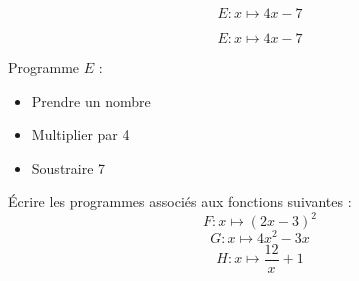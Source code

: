 \begin{frame}
    \begin{minipage}[t]{0.45\textwidth}
        $$E:x\mapsto 4x-7$$
    \end{minipage}
    \hfil
    \vrule
    \hfil
    \begin{minipage}[t]{0.45\textwidth}
        
    \end{minipage}
\end{frame}

\begin{frame}
    \begin{minipage}[t]{0.45\textwidth}
        $$E:x\mapsto 4x-7$$
    \end{minipage}
    \hfil
    \vrule
    \hfil
    \begin{minipage}[t]{0.45\textwidth}
        
        Programme $E$ : 
        \begin{itemize}
            \item Prendre un nombre
            \item Multiplier par 4
            \item Soustraire 7
        \end{itemize}
    \end{minipage}
\end{frame}

\begin{frame}
    Écrire les programmes associés aux fonctions suivantes :
    $$F:x\mapsto (2x-3)^2$$
    $$G:x\mapsto 4x^2-3x$$
    $$H:x\mapsto \dfrac{12}{x}+1$$
\end{frame}